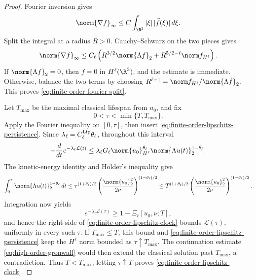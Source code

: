 \begin{proof}
Fourier inversion gives
\[
 \norm{\nabla f}_\infty
 \le C\int_{\R^3}|\xi|\,|\widehat f(\xi)|\,d\xi.
\]
Split the integral at a radius \(R>0\).  Cauchy--Schwarz on the two pieces
gives
\[
 \norm{\nabla f}_\infty
 \le C_\ell\left(
 R^{3/2}\norm{\Lambda f}_2
 +R^{5/2-\ell}\norm f_{H^\ell}
 \right).
\]
If \(\norm{\Lambda f}_2=0\), then \(f=0\) in \(H^\ell(\R^3)\), and the
estimate is immediate.  Otherwise, balance the two terms by choosing
\(R^{\ell-1}=\norm f_{H^\ell}/\norm{\Lambda f}_2\).  This proves
\eqref{eq:finite-order-fourier-split}.

Let \(T_{\max}\) be the maximal classical lifespan from \(u_0\), and fix
\[
 0<\tau<\min\{T,T_{\max}\}.
\]
Apply the Fourier inequality on \([0,\tau]\), then insert
\eqref{eq:finite-order-lipschitz-persistence}.  Since
\(\lambda_\ell=C_\ell^{\rm Lip}\theta_\ell\), throughout this interval
\[
 -\frac d{dt}e^{-\lambda_\ell\mathcal L(t)}
 \le \lambda_\ell G_\ell
 \norm{u_0}_{H^\ell}^{\theta_\ell}
 \norm{\Lambda u(t)}_2^{1-\theta_\ell}.
\]
The kinetic-energy identity and H\"older's inequality give
\[
 \int_0^\tau\norm{\Lambda u(t)}_2^{1-\theta_\ell}\,dt
 \le \tau^{(1+\theta_\ell)/2}
 \left(\frac{\norm{u_0}_2^2}{2\nu}\right)^{
 (1-\theta_\ell)/2}
 \le T^{(1+\theta_\ell)/2}
 \left(\frac{\norm{u_0}_2^2}{2\nu}\right)^{
 (1-\theta_\ell)/2}.
\]
Integration now yields
\[
 e^{-\lambda_\ell\mathcal L(\tau)}
 \ge1-\Xi_\ell[u_0,\nu;T],
\]
and hence the right side of
\eqref{eq:finite-order-lipschitz-clock} bounds
\(\mathcal L(\tau)\), uniformly in every such \(\tau\).
If \(T_{\max}\le T\), this bound and
\eqref{eq:finite-order-lipschitz-persistence} keep the \(H^\ell\) norm
bounded as \(\tau\uparrow T_{\max}\).  The continuation estimate
\eqref{eq:high-order-gronwall} would then extend the classical solution
past \(T_{\max}\), a contradiction.  Thus \(T<T_{\max}\); letting
\(\tau\uparrow T\) proves \eqref{eq:finite-order-lipschitz-clock}.


\end{proof}
